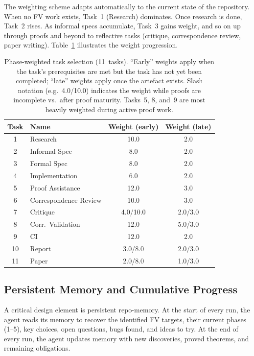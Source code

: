 \documentclass[sigconf,10pt]{acmart}
\begin{document}
The weighting scheme adapts automatically to the current state of
the repository.  When no FV work exists, Task~1 (Research) dominates.
Once research is done, Task~2 rises.  As informal specs accumulate,
Task~3 gains weight, and so on up through proofs and beyond to
reflective tasks (critique, correspondence review, paper writing).
Table~\ref{tab:weights} illustrates the weight progression.

\begin{table}[h]
\centering\small
\begin{tabular}{clcc}
\toprule
Task & Name & Weight (early) & Weight (late) \\
\midrule
1  & Research          & 10.0 & 2.0 \\
2  & Informal Spec     &  8.0 & 2.0 \\
3  & Formal Spec       &  8.0 & 2.0 \\
4  & Implementation    &  6.0 & 2.0 \\
5  & Proof Assistance  & 12.0 & 3.0 \\
6  & Correspondence Review & 10.0 & 3.0 \\
7  & Critique          &  4.0/10.0 & 2.0/3.0 \\
8  & Corr.\ Validation  & 12.0 & 5.0/3.0 \\
9  & CI                & 12.0 & 2.0 \\
10 & Report            &  3.0/8.0 & 2.0/3.0 \\
11 & Paper             &  2.0/8.0 & 1.0/3.0 \\
\bottomrule
\end{tabular}
\caption{Phase-weighted task selection (11~tasks).  ``Early'' weights
  apply when the task's prerequisites are met but the task has not yet been
  completed; ``late'' weights apply once the artefact exists.
  Slash notation (e.g.\ 4.0/10.0) indicates the weight while proofs are
  incomplete vs.\ after proof maturity.  Tasks~5, 8, and~9 are most
  heavily weighted during active proof work.}
\label{tab:weights}
\end{table}

\subsection{Persistent Memory and Cumulative Progress}

A critical design element is persistent repo-memory.  At the start of
every run, the agent reads its memory to recover the identified FV
targets, their current phases (1--5), key choices, open questions, bugs
found, and ideas to try.  At the end of every run, the agent updates
memory with new discoveries, proved theorems, and remaining obligations.
\end{document}
